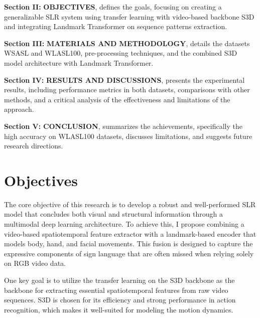 \documentclass{article}
\begin{document}
\noindent\textbf{Section II:} \textbf{OBJECTIVES}, defines the goals, focusing on creating a generalizable SLR system using transfer learning with video-based backbone S3D and integrating Landmark Transformer on sequence patterns extraction.

\vspace{0.25cm}

\noindent\textbf{Section III:} \textbf{MATERIALS AND METHODOLOGY}, details the datasets WSASL and WLASL100, pre-processing techniques, and the combined S3D model architecture with Landmark Transformer.

\vspace{0.25cm}

\noindent\textbf{Section IV:} \textbf{RESULTS AND DISCUSSIONS}, presents the experimental results, including performance metrics in both datasets, comparisons with other methods, and a critical analysis of the effectiveness and limitations of the approach.

\vspace{0.25cm}

\noindent\textbf{Section V:} \textbf{CONCLUSION}, summarizes the achievements, specifically the high accuracy on WLASL100 datasets, discusses limitations, and suggests future research directions.

\section{Objectives}
The core objective of this research is to develop a robust and well-performed SLR model that concludes both visual and structural information through a multimodal deep learning architecture. To achieve this, I propose combining a video-based spatiotemporal feature extractor with a landmark-based encoder that models body, hand, and facial movements. This fusion is designed to capture the expressive components of sign language that are often missed when relying solely on RGB video data.

\vspace{0.5cm}

One key goal is to utilize the transfer learning on the S3D \cite{xie2017rethinking} backbone as the backbone for extracting essential spatiotemporal features from raw video sequences. S3D \cite{xie2017rethinking} is chosen for its efficiency and strong performance in action recognition, which makes it well-suited for modeling the motion dynamics.

\vspace{0.5cm}
\end{document}
